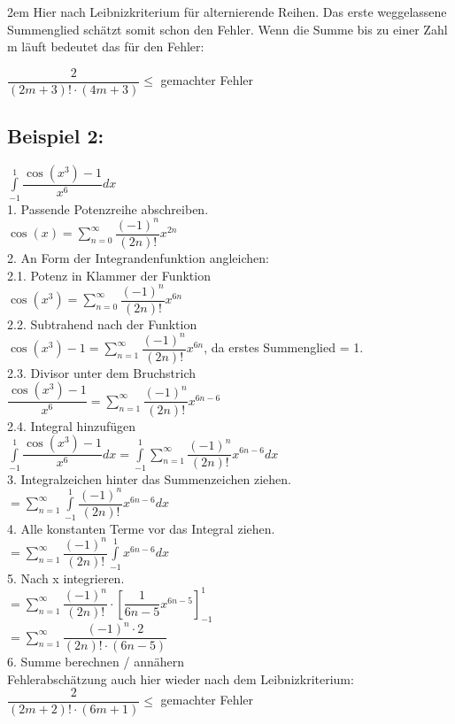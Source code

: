 \documentclass[11pt,final]{scrreprt}
\newcommand{\br} {\medskip\\}
\begin{document}
\begingroup
\leftskip2em 
Hier nach Leibnizkriterium für alternierende Reihen. Das erste weggelassene Summenglied schätzt somit schon den Fehler. Wenn die Summe bis zu einer Zahl m läuft bedeutet das für den Fehler:
\par	
\endgroup 
\hspace*{2em} $ \dfrac{2}{(2m+3)!\cdot (4m+3)} \leq $ gemachter Fehler\\

\newpage
\subsection*{Beispiel 2:}
\hspace*{2em} $\int\limits_{-1}^1 \dfrac{\cos(x^3)-1}{x^6} dx $\br
1. Passende Potenzreihe abschreiben.\\
\hspace*{2em} $ \cos(x) = \sum\limits_{n=0}^\infty \dfrac{(-1)^n}{(2n)!}x^{2n} $\br
2. An Form der Integrandenfunktion angleichen:\br
2.1. Potenz in Klammer der Funktion\\
\hspace*{2em} $ \cos(x^3) = \sum\limits_{n=0}^\infty \dfrac{(-1)^n}{(2n)!}x^{6n} $\br
2.2. Subtrahend nach der Funktion\\
\hspace*{2em} $ \cos(x^3)-1 = \sum\limits_{n=1}^\infty \dfrac{(-1)^n}{(2n)!}x^{6n} $, da erstes Summenglied = 1.\br
2.3. Divisor unter dem Bruchstrich\\
\hspace*{2em} $ \dfrac{\cos(x^3)-1}{x^6} = \sum\limits_{n=1}^\infty \dfrac{(-1)^n}{(2n)!}x^{6n-6} $\br
2.4. Integral hinzufügen\\
\hspace*{2em} $ \int\limits_{-1}^1\dfrac{\cos(x^3)-1}{x^6}dx = \int\limits_{-1}^1\sum\limits_{n=1}^\infty \dfrac{(-1)^n}{(2n)!}x^{6n-6}dx $\br
3. Integralzeichen hinter das Summenzeichen ziehen.\\
\hspace*{2em} $ = \sum\limits_{n=1}^\infty \int\limits_{-1}^1\dfrac{(-1)^n}{(2n)!}x^{6n-6}dx $\br
4. Alle konstanten Terme vor das Integral ziehen.\\
\hspace*{2em} $ = \sum\limits_{n=1}^\infty\dfrac{(-1)^n}{(2n)!} \int\limits_{-1}^1x^{6n-6}dx $\br
5. Nach x integrieren.\\
\hspace*{2em} $ = \sum\limits_{n=1}^\infty\dfrac{(-1)^n}{(2n)!}\cdot [\dfrac{1}{6n-5}x^{6n-5}]_{-1}^1 $\\
\hspace*{2em} $ = \sum\limits_{n=1}^\infty\dfrac{(-1)^n \cdot 2}{(2n)! \cdot (6n-5)}$\br
6. Summe berechnen / annähern\\
\hspace*{2em} Fehlerabschätzung auch hier wieder nach dem Leibnizkriterium:\\
\hspace*{2em} $ \dfrac{2}{(2m+2)!\cdot (6m+1)} \leq $ gemachter Fehler\\
\end{document}
